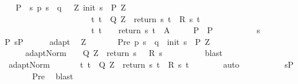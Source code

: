 \begin{isabellebody}
\ \ \isamarkupfalse%
\ {\isachardoublequoteopen}P\ {\isasymsubseteq}\ {\isacharbraceleft}s{\isachardot}\ p\ s\ {\isacharequal}\ q\ {\isasymand}\ {\isacharparenleft}{\isasymexists}\ Z{\isachardot}\ init\ s\ {\isasymin}\ P{\isacharprime}\ Z\ {\isasymand}\ \isanewline
\ \ \ \ \ \ \ \ \ \ \ \ \ \ \ \ \ \ \ \ \ \ {\isacharparenleft}{\isasymforall}t{\isachardot}\ t\ {\isasymin}\ Q{\isacharprime}\ Z\ {\isasymlongrightarrow}\ return\ s\ t\ {\isasymin}\ R\ s\ t{\isacharparenright}\ {\isasymand}\isanewline
\ \ \ \ \ \ \ \ \ \ \ \ \ \ \ \ \ \ \ \ \ \ {\isacharparenleft}{\isasymforall}t{\isachardot}\ t\ {\isasymin}\ {\isacharbraceleft}{\isacharbraceright}\ {\isasymlongrightarrow}\ return\ s\ t\ {\isasymin}\ A{\isacharparenright}{\isacharparenright}{\isacharbraceright}{\isachardoublequoteclose}\isanewline
\ \ \ \ {\isacharparenleft}\ {\isachardoublequoteopen}P\ {\isasymsubseteq}\ {\isacharquery}P{\isacharprime}{\isachardoublequoteclose}{\isacharparenright}\isanewline
\ \ \isamarkupfalse%
\ \isanewline
\ \ \ \ \isamarkupfalse%
\ s\isanewline
\ \ \ \ \isamarkupfalse%
\ P{\isacharcolon}\ {\isachardoublequoteopen}s{\isasymin}P{\isachardoublequoteclose}\isanewline
\ \ \ \ \isamarkupfalse%
\ adapt\ \isamarkupfalse%
\ Z\ \isanewline
\ \ \ \ \ \ Pre{\isacharcolon}\ {\isachardoublequoteopen}p\ s\ {\isacharequal}\ q\ {\isasymand}\ init\ s\ {\isasymin}\ P{\isacharprime}\ Z{\isachardoublequoteclose}\ \isanewline
\ \ \ \ \ \ adapt{\isacharunderscore}Norm{\isacharcolon}\ {\isachardoublequoteopen}{\isasymforall}{\isasymtau}{\isachardot}\ {\isasymtau}\ {\isasymin}\ Q{\isacharprime}\ Z\ {\isasymlongrightarrow}\ return\ s\ {\isasymtau}\ {\isasymin}\ R\ s\ {\isasymtau}{\isachardoublequoteclose}\ \isanewline
\ \ \ \ \ \ \isamarkupfalse%
\ blast\isanewline
\ \ \ \ \isamarkupfalse%
\ \ adapt{\isacharunderscore}Norm\ \isanewline
\ \ \ \ \isamarkupfalse%
\ {\isachardoublequoteopen}{\isasymforall}t{\isachardot}\ t\ {\isasymin}\ Q{\isacharprime}\ Z\ {\isasymlongrightarrow}\ return\ s\ t\ {\isasymin}\ R\ s\ t{\isachardoublequoteclose}\isanewline
\ \ \ \ \ \ \isamarkupfalse%
\ auto\isanewline
\ \ \ \ \isamarkupfalse%
\isanewline
\ \ \ \ \isamarkupfalse%
\ {\isachardoublequoteopen}s{\isasymin}{\isacharquery}P{\isacharprime}{\isachardoublequoteclose}\isanewline
\ \ \ \ \ \ \isamarkupfalse%
\ Pre\ \isamarkupfalse%
\ blast\isanewline

\end{isabellebody}
